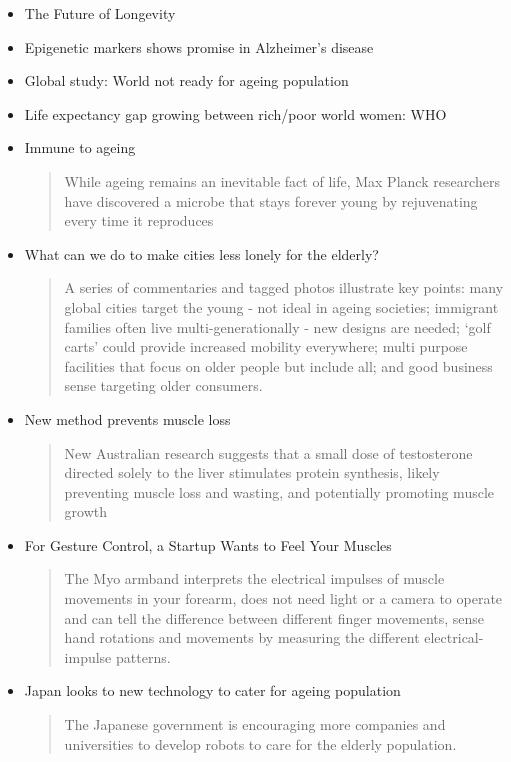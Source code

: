 \begin{itemize}
	\item The Future of Longevity
	\item Epigenetic markers shows promise in Alzheimer's disease
	\item Global study: World not ready for ageing population
	\item Life expectancy gap growing between rich/poor world women: WHO
	\item Immune to ageing
	\begin{quotation}
		While ageing remains an inevitable fact of life, Max Planck researchers have discovered a microbe that stays forever young by rejuvenating every time it reproduces\end{quotation}
	\item What can we do to make cities less lonely for the elderly?
	\begin{quotation}
		A series of commentaries and tagged photos illustrate key points: many global cities target the young - not ideal in ageing societies; immigrant families often live multi-generationally - new designs are needed; `golf carts' could provide increased mobility everywhere; multi purpose facilities that focus on older people but include all; and good business sense targeting older consumers.\end{quotation}
	\item New method prevents muscle loss
	\begin{quotation}
		New Australian research suggests that a small dose of testosterone directed solely to the liver stimulates protein synthesis, likely preventing muscle loss and wasting, and potentially promoting muscle growth\end{quotation}
	\item For Gesture Control, a Startup Wants to Feel Your Muscles
	\begin{quotation}
		The  Myo armband interprets the electrical impulses of muscle movements in your forearm, does not need light or a camera to operate and can tell the difference between different finger movements, sense hand rotations and movements by measuring the different electrical-impulse patterns.\end{quotation}
	\item Japan looks to new technology to cater for ageing population
	\begin{quotation}
		The Japanese government is encouraging more companies and universities to develop robots to care for the elderly population.\end{quotation}

\end{itemize}
